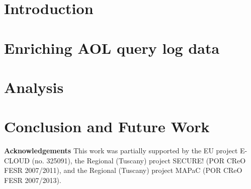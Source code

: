 \documentclass{style/sig-alternate}[9pt]
\newcommand{\comment}[2]{[\textbf{\color{red} #1}: \emph{#2}]\\}%
\newcommand{\manisha}[1]{\comment{manisha}{#1}}
\begin{document}
\section{Introduction}





%

\section{Enriching AOL query log data}



\section{Analysis}
%


\section{Conclusion and Future Work}





\vspace{0.1cm}

{ \footnotesize
{\bf {Acknowledgements}} This work was partially supported by the EU
project E-CLOUD (no. 325091), the Regional (Tuscany) project SECURE! (POR CReO
FESR 2007/2011),
and the Regional (Tuscany) project MAPaC (POR CReO FESR 2007/2013).
}

\scriptsize


\balancecolumns
\end{document}
